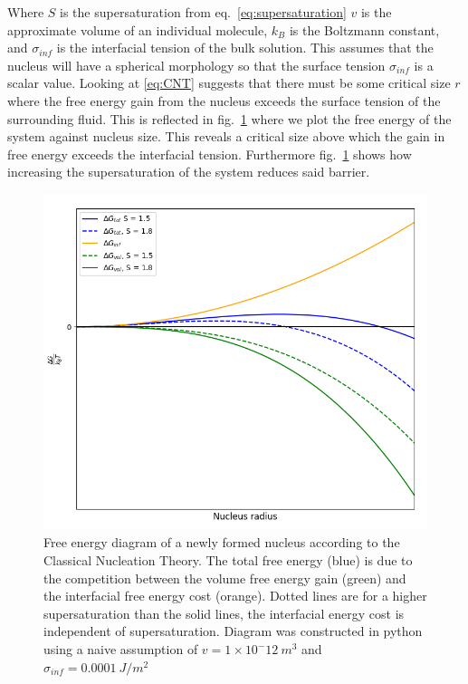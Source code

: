 Where $S$ is the supersaturation from eq.~\eqref{eq:supersaturation} 
$v$ is the approximate volume of an individual molecule, 
$k_B$ is the Boltzmann constant, and $\sigma_{inf}$ is the 
interfacial tension of the bulk solution. This assumes that 
the nucleus will have a spherical morphology so that the 
surface tension $\sigma_{inf}$ is a scalar value. Looking at 
\eqref{eq:CNT} suggests that there must be some critical size 
$r$ where the free energy gain from the nucleus exceeds the 
surface tension of the surrounding fluid. This is reflected in 
fig.~\ref{fig:free_energy} where we plot the free energy of the 
system against nucleus size. This reveals a critical size above 
which the gain in free energy exceeds the interfacial tension. 
Furthermore fig.~\ref{fig:free_energy} shows how increasing the 
supersaturation of the system reduces said barrier. 
\begin{figure}[h!]
	\centering
	\includegraphics[width=\linewidth]{Free_Energy_Diagram.png}
	\caption{Free energy diagram of a newly formed nucleus according 
		     to the Classical Nucleation Theory. The total free energy (blue)
		     is due to the competition between the volume free energy gain
		     (green) and the interfacial free energy cost (orange). Dotted
		     lines are for a higher supersaturation than the solid lines,
		     the interfacial energy cost is independent of supersaturation.
		     Diagram was constructed in python using a naive assumption 
		     of $v=1\times 10^-12\ m^3$ and $\sigma_{inf}=0.0001\ J/m^2$}
	\label{fig:free_energy}
\end{figure}

